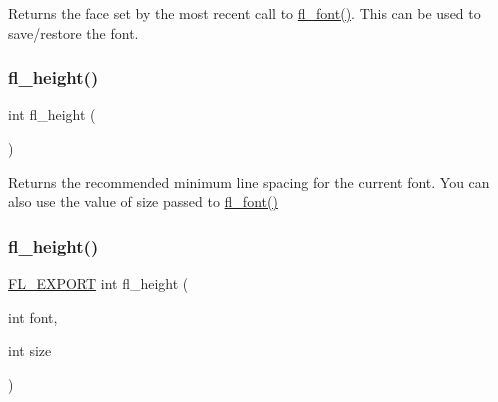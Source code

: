 Returns the {\ttfamily face} set by the most recent call to \hyperlink{group__fl__attributes_ga80203d2dd1e06550e7a35d6bb72f9bd6}{fl\+\_\+font()}. This can be used to save/restore the font. \mbox{\label{group__fl__attributes_gac4acb828270adf35bf1d8fc06051f938}} 
\subsubsection{\texorpdfstring{fl\+\_\+height()}{fl\_height()}\hspace{0.1cm}{\footnotesize\ttfamily [1/2]}}
{\footnotesize\ttfamily int fl\+\_\+height (\begin{DoxyParamCaption}{ }\end{DoxyParamCaption})\hspace{0.3cm}{\ttfamily [inline]}}

Returns the recommended minimum line spacing for the current font. You can also use the value of {\ttfamily size} passed to \hyperlink{group__fl__attributes_ga80203d2dd1e06550e7a35d6bb72f9bd6}{fl\+\_\+font()} \mbox{\label{group__fl__attributes_ga287690bb893d1cc57a5010d59b2da8c9}} 
\subsubsection{\texorpdfstring{fl\+\_\+height()}{fl\_height()}\hspace{0.1cm}{\footnotesize\ttfamily [2/2]}}
{\footnotesize\ttfamily \hyperlink{_fl___export_8_h_aa9ba29a18aee9d738370a06eeb4470fc}{F\+L\+\_\+\+E\+X\+P\+O\+RT} int fl\+\_\+height (\begin{DoxyParamCaption}\item[{int}]{font,  }\item[{int}]{size }\end{DoxyParamCaption})}

\mbox{\label{group__fl__attributes_ga47015273468749763dcdd97e2aef2c52}} 
